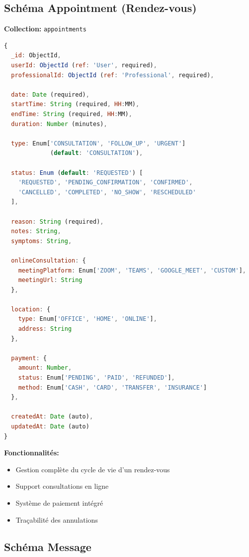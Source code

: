 \documentclass[12pt,a4paper]{article}
\begin{document}
\subsection{Schéma Appointment (Rendez-vous)}

\textbf{Collection:} \texttt{appointments}

\begin{lstlisting}[language=JavaScript,caption=Modèle Appointment (extrait)]
{
  _id: ObjectId,
  userId: ObjectId (ref: 'User', required),
  professionalId: ObjectId (ref: 'Professional', required),
  
  date: Date (required),
  startTime: String (required, HH:MM),
  endTime: String (required, HH:MM),
  duration: Number (minutes),
  
  type: Enum['CONSULTATION', 'FOLLOW_UP', 'URGENT']
             (default: 'CONSULTATION'),
  
  status: Enum (default: 'REQUESTED') [
    'REQUESTED', 'PENDING_CONFIRMATION', 'CONFIRMED',
    'CANCELLED', 'COMPLETED', 'NO_SHOW', 'RESCHEDULED'
  ],
  
  reason: String (required),
  notes: String,
  symptoms: String,
  
  onlineConsultation: {
    meetingPlatform: Enum['ZOOM', 'TEAMS', 'GOOGLE_MEET', 'CUSTOM'],
    meetingUrl: String
  },
  
  location: {
    type: Enum['OFFICE', 'HOME', 'ONLINE'],
    address: String
  },
  
  payment: {
    amount: Number,
    status: Enum['PENDING', 'PAID', 'REFUNDED'],
    method: Enum['CASH', 'CARD', 'TRANSFER', 'INSURANCE']
  },
  
  createdAt: Date (auto),
  updatedAt: Date (auto)
}
\end{lstlisting}

\textbf{Fonctionnalités:}
\begin{itemize}
    \item Gestion complète du cycle de vie d'un rendez-vous
    \item Support consultations en ligne
    \item Système de paiement intégré
    \item Traçabilité des annulations
\end{itemize}

\subsection{Schéma Message}
\end{document}
